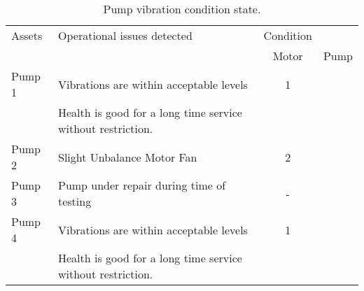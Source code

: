 \begin{table}[!h]
	\caption{Pump vibration condition state.}
	\label{ch045_tbl_vibration_data}
	{\footnotesize
\begin{tabular}{l|l|c|c}

\hline
Assets & Operational issues detected & \multicolumn{1}{c}{Condition} &  \\ 
\cline{3-4}
 &  & Motor & Pump \\ 
\hline
Pump 1 & Vibrations are within acceptable levels & 1 &  \\ 
 & Health is good for a long time service without restriction. &  &  \\ 

Pump 2 & Slight Unbalance Motor Fan & 2 &  \\ 

Pump 3 & Pump under repair during time of testing& - &  \\ 

Pump 4 & Vibrations are within acceptable levels & 1 &  \\ 
 & Health is good for a long time service without restriction. &  &  \\ 
\hline

\end{tabular}
	}
\end{table}